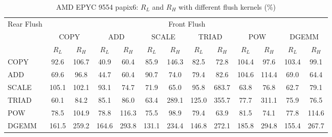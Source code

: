 \begin{table}[htbp]
\centering
\caption{AMD EPYC 9554 papix6: $R_L$ and $R_H$ with different flush kernels (\%)}
\label{tab:frkern-camd9554n2-papix6}
\begin{tabular*}{\textwidth}{@{\extracolsep{\fill}}lcccccccccccc}
\toprule
\multirow{3}{*}{Rear Flush} & \multicolumn{12}{c}{Front Flush} \\ \cmidrule(lr){2-13}
& \multicolumn{2}{c}{COPY} & \multicolumn{2}{c}{ADD} & \multicolumn{2}{c}{SCALE} & \multicolumn{2}{c}{TRIAD} & \multicolumn{2}{c}{POW} & \multicolumn{2}{c}{DGEMM} \\ \cmidrule(lr){2-3} \cmidrule(lr){4-5} \cmidrule(lr){6-7} \cmidrule(lr){8-9} \cmidrule(lr){10-11} \cmidrule(lr){12-13}
& $R_L$ & $R_H$ & $R_L$ & $R_H$ & $R_L$ & $R_H$ & $R_L$ & $R_H$ & $R_L$ & $R_H$ & $R_L$ & $R_H$ \\ \midrule
COPY & 92.6 & 106.7 & 40.9 & 60.4 & 85.9 & 146.3 & 82.5 & 72.8 & 104.4 & 97.6 & 103.4 & 99.1 \\
ADD & 69.6 & 96.8 & 44.7 & 60.4 & 90.7 & 74.0 & 79.4 & 82.6 & 104.6 & 114.4 & 69.0 & 64.4 \\
SCALE & 105.1 & 102.1 & 93.1 & 74.7 & 71.9 & 65.0 & 95.8 & 683.7 & 63.8 & 76.8 & 62.7 & 79.1 \\
TRIAD & 60.1 & 84.2 & 85.1 & 86.0 & 63.4 & 289.1 & 125.0 & 355.7 & 77.7 & 311.1 & 75.9 & 76.5 \\
POW & 78.5 & 104.9 & 78.8 & 116.3 & 75.5 & 98.9 & 79.4 & 63.9 & 81.5 & 74.1 & 77.8 & 114.6 \\
DGEMM & 161.5 & 259.2 & 164.6 & 293.8 & 131.1 & 234.4 & 146.8 & 272.1 & 185.8 & 294.8 & 155.4 & 267.7 \\
\bottomrule
\end{tabular*}
\end{table}